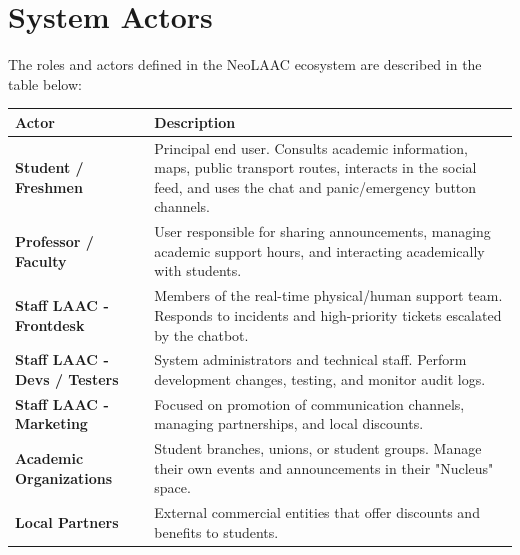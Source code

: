 \section{System Actors}
The roles and actors defined in the Neo\ac{LAAC} ecosystem are described in the table below:

\vspace{0.3cm}
\begin{tabular}{|l|p{11.5cm}|}
\hline
\textbf{Actor} & \textbf{Description} \\ \hline
\textbf{Student / Freshmen} & Principal end user. Consults academic information, maps, public transport routes, interacts in the social feed, and uses the chat and panic/emergency button channels. \\ \hline
\textbf{Professor / Faculty} & User responsible for sharing announcements, managing academic support hours, and interacting academically with students. \\ \hline
\textbf{Staff \ac{LAAC} - Frontdesk} & Members of the real-time physical/human support team. Responds to incidents and high-priority tickets escalated by the chatbot. \\ \hline
\textbf{Staff \ac{LAAC} - Devs / Testers} & System administrators and technical staff. Perform development changes, testing, and monitor audit logs. \\ \hline
\textbf{Staff \ac{LAAC} - Marketing} & Focused on promotion of communication channels, managing partnerships, and local discounts. \\ \hline
\textbf{Academic Organizations} & Student branches, unions, or student groups. Manage their own events and announcements in their "Nucleus" space. \\ \hline
\textbf{Local Partners} & External commercial entities that offer discounts and benefits to students. \\ \hline
\end{tabular}

\vspace{0.6cm}

